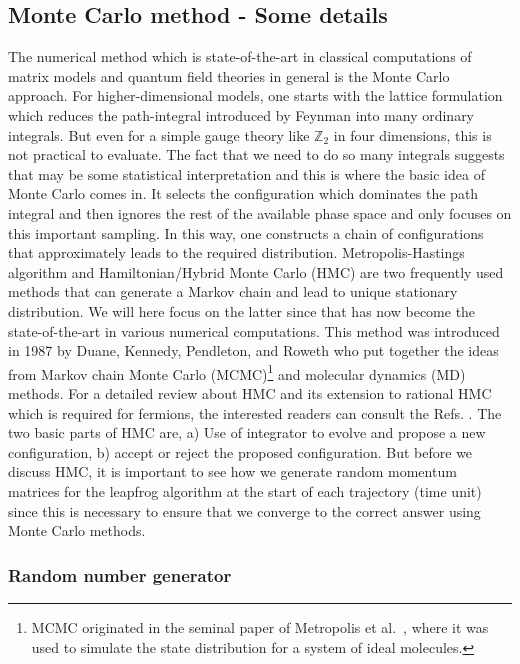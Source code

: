 \documentclass[11pt]{article}
\begin{document}
\subsection{Monte Carlo method - Some details}
The numerical method which is state-of-the-art in classical computations 
of matrix models and quantum field theories in general is the Monte Carlo approach.
For higher-dimensional models, one starts with the lattice formulation which reduces the 
path-integral introduced by Feynman into many ordinary integrals. But even for a simple
gauge theory like $\mathbb{Z}_{2}$ in four dimensions, this is not practical to evaluate. 
The fact that we need to do so many integrals suggests that may be some statistical 
interpretation and this is where the basic idea of Monte Carlo comes in. It selects the 
configuration which dominates the path integral and then ignores the rest of the available
phase space and only focuses on this important sampling. In this way, one constructs a chain of configurations 
that approximately leads to the required distribution. 
Metropolis-Hastings algorithm and Hamiltonian/Hybrid Monte Carlo (HMC) 
are two frequently used methods that
can generate a Markov chain and lead to unique stationary distribution. 
We will here focus on the latter since that has now become the state-of-the-art in 
various numerical computations. This method was introduced in 
1987 by Duane, Kennedy, Pendleton, and Roweth \cite{Duane:1987de} who put together the ideas from
Markov chain Monte Carlo (MCMC)\footnote{MCMC originated in the seminal paper of 
Metropolis et al.~\cite{Metropolis:1953am}, where it was used to simulate the state distribution for a system of ideal molecules.} 
and molecular dynamics (MD) methods. 
For a detailed review about HMC and its extension to rational 
HMC which is required for fermions, the interested readers 
can consult the Refs. \cite{Hanada:2018fnp,Joseph:2019zer}. 
The two basic parts of HMC are, a) Use of integrator to evolve and propose a new configuration, b) accept or reject
the proposed configuration. But before we discuss HMC, 
it is important to see how we generate random momentum 
matrices for the leapfrog algorithm 
at the start of each trajectory (time unit) since 
this is necessary to ensure that we converge to the 
correct answer using Monte Carlo methods. 


\subsubsection{Random number generator}  
\end{document}
